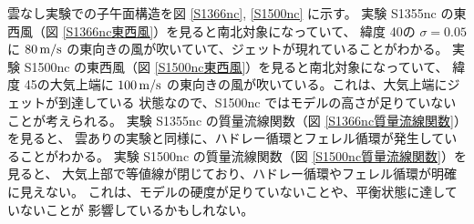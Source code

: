 \documentclass[body]{subfiles}
\begin{document}
雲なし実験での子午面構造を図 \ref{S1366nc}, \ref{S1500nc} に示す。
実験 S1355nc の東西風（図 \ref{S1366nc東西風}）を見ると南北対象になっていて、
緯度 40\textdegree の \(\sigma=0.05\) に \(80\hmu{m/s}\)
の東向きの風が吹いていて、ジェットが現れていることがわかる。
実験 S1500nc の東西風（図 \ref{S1500nc東西風}）を見ると南北対象になっていて、
緯度 45\textdegree の大気上端に \(100\hmu{m/s}\)
の東向きの風が吹いている。これは、大気上端にジェットが到達している
状態なので、S1500nc ではモデルの高さが足りていないことが考えられる。
実験 S1355nc の質量流線関数（図 \ref{S1366nc質量流線関数}）を見ると、
雲ありの実験と同様に、ハドレー循環とフェレル循環が発生していることがわかる。
実験 S1500nc の質量流線関数（図 \ref{S1500nc質量流線関数}）を見ると、
大気上部で等値線が閉じており、ハドレー循環やフェレル循環が明確に見えない。
これは、モデルの硬度が足りていないことや、平衡状態に達していないことが
影響しているかもしれない。
\end{document}
